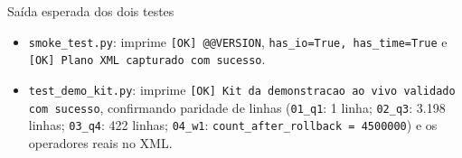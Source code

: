 \documentclass[10pt,a4paper]{article}
\begin{document}
\begin{passoBox}[OkGreen]{Saída esperada dos dois testes}
\begin{itemize}[leftmargin=14pt,itemsep=1pt,topsep=1pt]
  \item \texttt{smoke\_test.py}: imprime \texttt{[OK] @@VERSION}, \texttt{has\_io=True, has\_time=True} e \texttt{[OK] Plano XML capturado com sucesso}.
  \item \texttt{test\_demo\_kit.py}: imprime \texttt{[OK] Kit da demonstracao ao vivo validado com sucesso}, confirmando paridade de linhas (\texttt{01\_q1}: 1 linha; \texttt{02\_q3}: 3.198 linhas; \texttt{03\_q4}: 422 linhas; \texttt{04\_w1}: \texttt{count\_after\_rollback = 4500000}) e os operadores reais no XML.
\end{itemize}
\end{passoBox}
\end{document}
